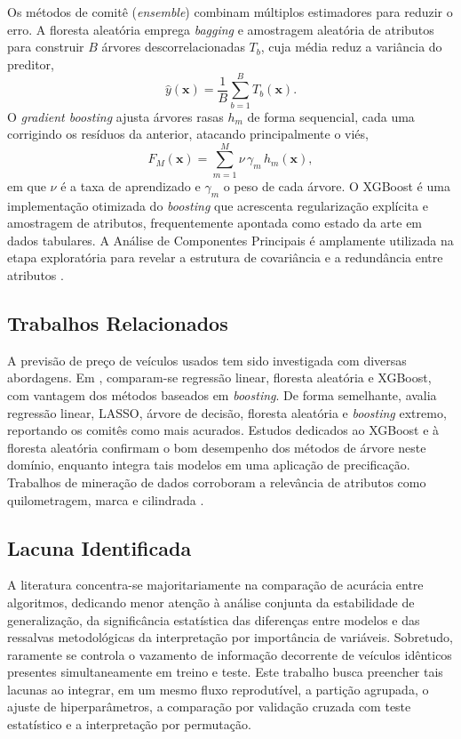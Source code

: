\documentclass[conference]{IEEEtran}
\begin{document}
Os métodos de comitê (\textit{ensemble}) combinam múltiplos estimadores para reduzir o erro. A floresta aleatória \cite{breiman} emprega \textit{bagging} e amostragem aleatória de atributos para construir $B$ árvores descorrelacionadas $T_b$, cuja média reduz a variância do preditor,
\begin{equation}
\hat{y}(\mathbf{x}) = \frac{1}{B}\sum_{b=1}^{B} T_b(\mathbf{x}). \label{eq:rf}
\end{equation}
O \textit{gradient boosting} \cite{friedman} ajusta árvores rasas $h_m$ de forma sequencial, cada uma corrigindo os resíduos da anterior, atacando principalmente o viés,
\begin{equation}
F_M(\mathbf{x}) = \sum_{m=1}^{M} \nu\, \gamma_m\, h_m(\mathbf{x}), \label{eq:gb}
\end{equation}
em que $\nu$ é a taxa de aprendizado e $\gamma_m$ o peso de cada árvore. O XGBoost \cite{chen2016} é uma implementação otimizada do \textit{boosting} que acrescenta regularização explícita e amostragem de atributos, frequentemente apontada como estado da arte em dados tabulares. A Análise de Componentes Principais é amplamente utilizada na etapa exploratória para revelar a estrutura de covariância e a redundância entre atributos \cite{hastie}.

\subsection{Trabalhos Relacionados}
A previsão de preço de veículos usados tem sido investigada com diversas abordagens. Em \cite{itm2025}, comparam-se regressão linear, floresta aleatória e XGBoost, com vantagem dos métodos baseados em \textit{boosting}. De forma semelhante, \cite{preowned2023} avalia regressão linear, LASSO, árvore de decisão, floresta aleatória e \textit{boosting} extremo, reportando os comitês como mais acurados. Estudos dedicados ao XGBoost \cite{revolution} e à floresta aleatória \cite{howmuch} confirmam o bom desempenho dos métodos de árvore neste domínio, enquanto \cite{mobileapp2022} integra tais modelos em uma aplicação de precificação. Trabalhos de mineração de dados corroboram a relevância de atributos como quilometragem, marca e cilindrada \cite{ritthesis}.

\subsection{Lacuna Identificada}
A literatura concentra-se majoritariamente na comparação de acurácia entre algoritmos, dedicando menor atenção à análise conjunta da estabilidade de generalização, da significância estatística das diferenças entre modelos e das ressalvas metodológicas da interpretação por importância de variáveis. Sobretudo, raramente se controla o vazamento de informação decorrente de veículos idênticos presentes simultaneamente em treino e teste. Este trabalho busca preencher tais lacunas ao integrar, em um mesmo fluxo reprodutível, a partição agrupada, o ajuste de hiperparâmetros, a comparação por validação cruzada com teste estatístico e a interpretação por permutação.
\end{document}
